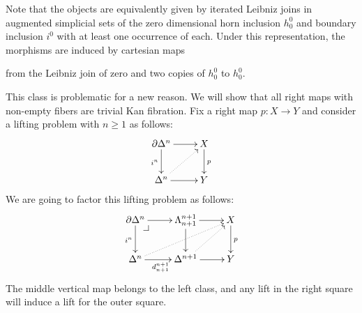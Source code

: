 \documentclass[reqno,10pt,a4paper,oneside]{amsart}
\begin{document}
Note that the objects are equivalently given by iterated Leibniz joins in augmented simplicial sets of the zero dimensional horn inclusion $h_0^0$ and boundary inclusion $i^0$ with at least one occurrence of each.
Under this representation, the morphisms are induced by cartesian maps
from the Leibniz join of zero and two copies of $h_0^0$ to $h_0^0$.

This class is problematic for a new reason.
We will show that all right maps with non-empty fibers are trivial Kan fibration.
Fix a right map $p : X \to Y$ and consider a lifting problem with $n \geq 1$ as follows:
\[
\xymatrix{
  \partial \Delta^n
  \ar[r]
  \ar[d]_{i^n}
&
  X
  \ar[d]^{p}
\\
  \Delta^n
  \ar[r]
  \ar@{.>}[ur]
&
  Y
}
\]
We are going to factor this lifting problem as follows:
\[
\xymatrix{
  \partial \Delta^n
  \ar[r]
  \ar[d]_{i^n}
  \pullback{dr}
&
  \Lambda_{n+1}^{n+1}
  \ar[r]
  \ar[d]
&
  X
  \ar[d]^{p}
\\
  \Delta^n
  \ar[r]_{d_{n+1}^{n+1}}
  \ar@{.>}[urr]
&
  \Delta^{n+1}
  \ar[r]
  \ar@{.>}[ur]
&
  Y
}
\]
The middle vertical map belongs to the left class, and any lift in the right square will induce a lift for the outer square.
\end{document}
